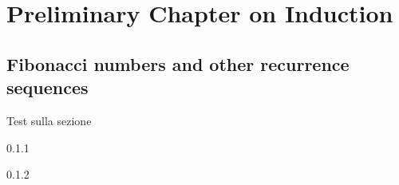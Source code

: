 
\chapter{Preliminary Chapter on Induction}\label{chp:preliminary}

\section{Fibonacci numbers and other recurrence sequences}

Test sulla sezione

\begin{solexe}{0.1.1}
    \lipsum[2]
\end{solexe}

\begin{solexe}{0.1.2}
    \lipsum[7]
\end{solexe}